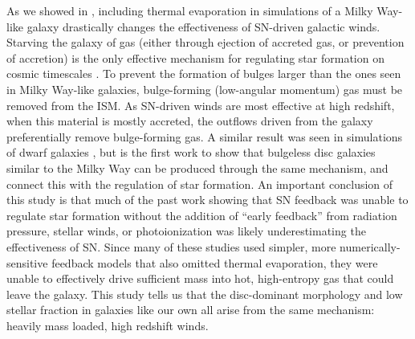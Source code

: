 As we showed in \citet{Keller2015}, including thermal evaporation in simulations
of a Milky Way-like galaxy drastically changes the effectiveness of SN-driven
galactic winds.  Starving the galaxy of gas (either through ejection of accreted
gas, or prevention of accretion) is the only effective mechanism for regulating
star formation on cosmic timescales \citep{Keres2009}.  To prevent the formation
of bulges larger than the ones seen in Milky Way-like galaxies, bulge-forming
(low-angular momentum) gas must be removed from the ISM.  As SN-driven winds are
most effective at high redshift, when this material is mostly accreted, the
outflows driven from the galaxy preferentially remove bulge-forming gas.  A
similar result was seen in simulations of dwarf galaxies \citep{Governato2010,
Brook2011}, but \citet{Keller2015} is the first work to show that bulgeless disc
galaxies similar to the Milky Way can be produced through the same mechanism,
and connect this with the regulation of star formation.  An important conclusion
of this study is that much of the past work
\citep{Stinson2013,Agertz2013,Hopkins2014} showing that SN feedback was unable
to regulate star formation without the addition of ``early feedback'' from
radiation pressure, stellar winds, or photoionization was likely underestimating
the effectiveness of SN.  Since many of these studies used simpler, more
numerically-sensitive feedback models that also omitted thermal evaporation,
they were unable to effectively drive sufficient mass into hot, high-entropy gas
that could leave the galaxy.  This study tells us that the disc-dominant
morphology and low stellar fraction in galaxies like our own all arise from the
same mechanism:  heavily mass loaded, high redshift winds.

